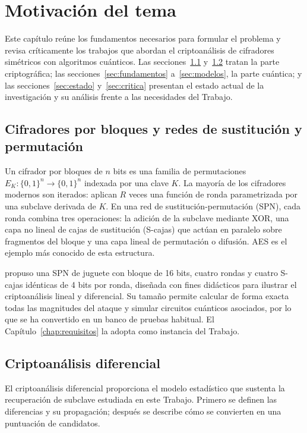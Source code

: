 \chapter{Motivación del tema}
\label{chap:contexto}

Este capítulo reúne los fundamentos necesarios para formular el problema y revisa críticamente los trabajos que abordan el criptoanálisis de cifradores simétricos con algoritmos cuánticos. Las secciones~\ref{sec:spn} y~\ref{sec:diferencial} tratan la parte criptográfica; las secciones~\ref{sec:fundamentos} a~\ref{sec:modelos}, la parte cuántica; y las secciones~\ref{sec:estado} y~\ref{sec:critica} presentan el estado actual de la investigación y su análisis frente a las necesidades del Trabajo.

\section{Cifradores por bloques y redes de sustitución y permutación}
\label{sec:spn}

Un cifrador por bloques de \(n\) bits es una familia de permutaciones \(E_K:\{0,1\}^n\to\{0,1\}^n\) indexada por una clave \(K\). La mayoría de los cifradores modernos son iterados: aplican \(R\) veces una función de ronda parametrizada por una subclave derivada de \(K\). En una red de sustitución-permutación (SPN), cada ronda combina tres operaciones: la adición de la subclave mediante XOR, una capa no lineal de cajas de sustitución (S-cajas) que actúan en paralelo sobre fragmentos del bloque y una capa lineal de permutación o difusión. AES es el ejemplo más conocido de esta estructura.

\citet{heys2002} propuso una SPN de juguete con bloque de 16 bits, cuatro rondas y cuatro S-cajas idénticas de 4 bits por ronda, diseñada con fines didácticos para ilustrar el criptoanálisis lineal y diferencial. Su tamaño permite calcular de forma exacta todas las magnitudes del ataque y simular circuitos cuánticos asociados, por lo que se ha convertido en un banco de pruebas habitual. El Capítulo~\ref{chap:requisitos} la adopta como instancia del Trabajo.

\section{Criptoanálisis diferencial}
\label{sec:diferencial}

El criptoanálisis diferencial proporciona el modelo estadístico que sustenta la recuperación de subclave estudiada en este Trabajo. Primero se definen las diferencias y su propagación; después se describe cómo se convierten en una puntuación de candidatos.

